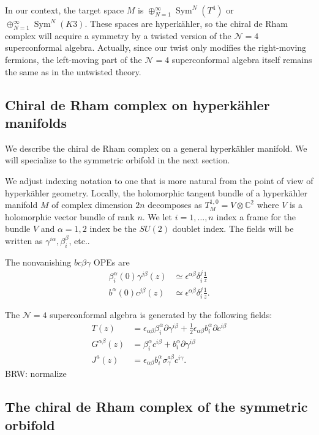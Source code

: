 \documentclass[11pt]{amsart}
\newcommand{\del}{\partial}
\newcommand{\eps}{\epsilon}
\newcommand{\CC}{\mathbb C}
\newcommand{\mc}{\mathcal}
\def\eps{{\epsilon}}
\DeclareMathOperator{\Sym}{Sym} \DeclareMathOperator{\Hom}{Hom}
\def\brian#1{{\textcolor{blue!65!red}{BRW: {#1}}}}
\def\beqn{\begin{equation}}
\def\eeqn{\end{equation}}
\theoremstyle{thm}
\numberwithin{equation}{subsection}
\theoremstyle{def}
\theoremstyle{rem}
\begin{document}
In our context, the target space $M$ is $\oplus_{N=1}^\infty \Sym^N (T^4)$ or $\oplus_{N=1}^\infty \Sym^N (K3)$. 
These spaces are hyperk\"ahler, so the chiral de Rham complex will acquire a symmetry by a twisted version of the $\mc N = 4$ superconformal algebra. 
Actually, since our twist only modifies the right-moving fermions, the left-moving part of the $\mc N = 4$ superconformal algebra itself remains the same as in the untwisted theory. 

\subsection{Chiral de Rham complex on hyperk\"ahler manifolds}

We describe the chiral de Rham complex on a general hyperk\"ahler manifold. 
We will specialize to the symmetric orbifold in the next section. 

We adjust indexing notation to one that is more natural from the point of view of hyperk\"ahler geometry.
Locally, the holomorphic tangent bundle of a hyperk\"ahler manifold $M$ of complex dimension $2n$ decomposes as $T^{1,0}_M = V \otimes \CC^2$ where $V$ is a holomorphic vector bundle of rank $n$. 
We let $i = 1,\ldots, n$ index a frame for the bundle $V$ and $\alpha = 1,2$ index be the $SU(2)$ doublet index. 
The fields will be written as $\gamma^{i\alpha}, \beta_i^\beta$, etc..

The nonvanishing $bc \beta\gamma$ OPEs are
\beqn
\begin{split}
\beta_i^\alpha (0) \gamma^{j\beta} (z) & \simeq \eps^{\alpha \beta} \delta_i^j \frac1z \\
b^\alpha (0) c^{j\beta} (z) & \simeq \eps^{\alpha \beta} \delta_i^j  \frac1z .
\end{split}
\eeqn

The $\mc N=4$ superconformal algebra is generated by the following fields:
\beqn
\begin{split}
T(z) & = \eps_{\alpha\beta} \beta_i^\alpha \del \gamma^{i \beta} + \frac12 \eps_{\alpha \beta} b^\alpha_i \del c^{i \beta}  \\
G^{\alpha \beta} (z) & = \beta_i^\alpha c^{i \beta} + b_i^\alpha \del \gamma^{i \beta} \\
J^a (z) & = \eps_{\alpha \beta} b_i^\alpha \sigma^{a \beta}_\gamma c^{i \gamma} .
\end{split}
\eeqn
\brian{normalize}

\subsection{The chiral de Rham complex of the symmetric orbifold}
\end{document}
